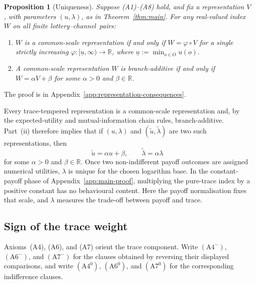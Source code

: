\documentclass[11pt,a4paper]{article}
\newtheorem{proposition}[theorem]{Proposition}
\theoremstyle{definition}
\newcommand{\1}{\mathbf 1}
\begin{document}
\begin{proposition}[Uniqueness]\label{prop:uniqueness}
Suppose \textup{(A1)--(A8)} hold, and fix a representation $V$, with parameters $(u,\lambda)$, as in
Theorem~\ref{thm:main}.  For any real-valued index $W$ on all finite lottery--channel~pairs:
\begin{enumerate}[label=\textup{(\roman*)},leftmargin=*]
\item $W$ is a common-scale representation if and only if $W=\varphi\circ V$ for a single strictly increasing
$\varphi:[\underline u,\infty)\to\mathbb R$, where $\underline u:=\min_{o\in O}u(o)$.
\item A common-scale representation $W$ is branch-additive if and only if
$W=\alpha V+\beta$ for some $\alpha>0$ and $\beta\in\mathbb R$.
\end{enumerate}
\end{proposition}

The proof is in Appendix~\ref{app:representation-consequences}.

Every trace-tempered representation is a common-scale representation and, by the expected-utility and
mutual-information chain rules, branch-additive.  Part~\textup{(ii)} therefore implies that if $(u,\lambda)$ and
$(\widetilde u,\widetilde\lambda)$ are two such representations, then
\[
 \widetilde u=\alpha u+\beta,
 \qquad
 \widetilde\lambda=\alpha\lambda
\]
for some $\alpha>0$ and $\beta\in\mathbb R$.  Once two non-indifferent payoff outcomes are assigned numerical
utilities, $\lambda$ is unique for the chosen logarithm base.  In the constant-payoff phase of
Appendix~\ref{app:main-proof}, multiplying the pure-trace index by a positive constant has no behavioural content.  Here
the payoff normalisation fixes that scale, and $\lambda$ measures the trade-off between payoff and trace.

\subsection{Sign of the trace weight}

Axioms~\textup{(A4)},
\textup{(A6)}, and \textup{(A7)} orient the trace component.  Write $(\mathrm{A}4^-)$,
$(\mathrm{A}6^-)$, and $(\mathrm{A}7^-)$ for the clauses obtained by reversing their displayed comparisons,
and write $(\mathrm{A}4^0)$, $(\mathrm{A}6^0)$, and $(\mathrm{A}7^0)$ for the corresponding indifference clauses.
\end{document}

